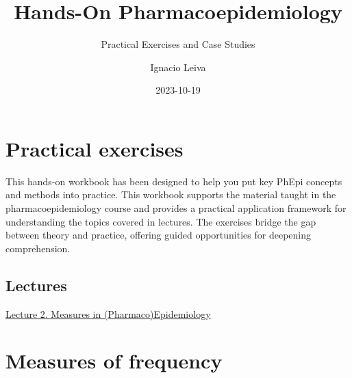 \documentclass[
  letterpaper,
  paper=6in:9in,
  pagesize=pdftex,
  headinclude=on,
  footinclude=on,
  12pt]{scrbook}
\title{Hands-On Pharmacoepidemiology}
\subtitle{Practical Exercises and Case Studies}
\author{Ignacio Leiva}
\date{2023-10-19}
\renewcommand*\contentsname{Table of contents}
\newcommand\contentsname{Table of contents}
\begin{document}
\frontmatter
\maketitle
{}  

\ifdefined\Shaded\renewenvironment{Shaded}{\begin{tcolorbox}[enhanced, frame hidden, sharp corners, breakable, interior hidden, borderline west={3pt}{0pt}{shadecolor}, boxrule=0pt]}{\end{tcolorbox}}\fi

\renewcommand*\contentsname{Table of contents}
{
\setcounter{tocdepth}{2}
\tableofcontents
}
\mainmatter
{}

\hypertarget{practical-exercises}{%
\chapter*{Practical exercises}\label{practical-exercises}}


This hands-on workbook has been designed to help you put key PhEpi
concepts and methods into practice. This workbook supports the material
taught in the pharmacoepidemiology course and provides a practical
application framework for understanding the topics covered in lectures.
The exercises bridge the gap between theory and practice, offering
guided opportunities for deepening comprehension.

\hypertarget{lectures}{%
\section*{Lectures}\label{lectures}}


\href{https://ignaleiva.github.io/Lecture2-Frequency-Effect/\#/section}{Lecture
2. Measures in (Pharmaco)Epidemiology}


\hypertarget{sec-measure-of-frequency}{%
\chapter{Measures of frequency}\label{sec-measure-of-frequency}}
\end{document}
